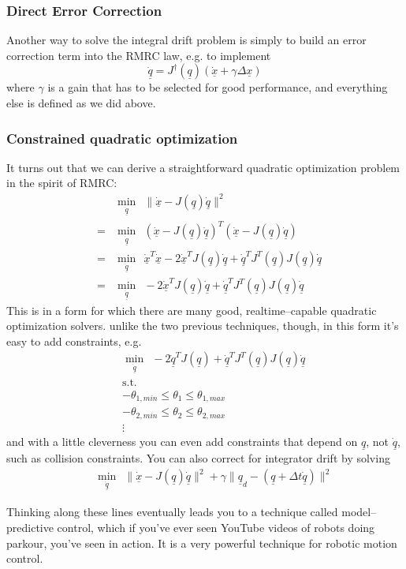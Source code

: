 \documentclass[]{article}
\begin{document}
\subsubsection{Direct Error Correction}
Another way to solve the integral drift problem is simply to build an error correction term into the RMRC law, e.g. to implement
\begin{displaymath}
\dot{\underline{q}} = J^{\dag}(\underline{q})\left(\dot{\underline{x}} + \gamma \Delta \underline{x}\right)
\end{displaymath}
where $\gamma$ is a gain that has to be selected for good performance, and everything else is defined as we did above.
\subsubsection{Constrained quadratic optimization}
It turns out that we can derive a straightforward quadratic optimization problem in the spirit of RMRC:
\begin{eqnarray}
&&\min_{\dot{\underline{q}}} \ \ \|\dot{\underline{x}} - J(\underline{q})\dot{\underline{q}}\|^{2} \nonumber \\
& = & \min_{\dot{\underline{q}}}\ \ \left( \dot{\underline{x}} - J(\underline{q})\dot{\underline{q}} \right)^{T}\left( \dot{\underline{x}} - J(\underline{q})\dot{\underline{q}} \right) \nonumber \\
& = & \min_{\dot{\underline{q}}}\ \ \dot{\underline{x}}^{T}\dot{\underline{x}} - 2\dot{\underline{x}}^{T}J(\underline{q})\dot{\underline{q}} + \dot{\underline{q}}^{T}J^{T}(\underline{q})J(\underline{q})\dot{\underline{q}} \nonumber \\
& = & \min_{\dot{\underline{q}}}\ \ -2\dot{\underline{x}}^{T}J(\underline{q})\dot{\underline{q}} + \dot{\underline{q}}^{T}J^{T}(\underline{q})J(\underline{q})\dot{\underline{q}} \nonumber
\end{eqnarray}
This is in a form for which there are many good, realtime--capable quadratic optimization solvers. unlike the two previous techniques, though, in this form it's easy to add constraints, e.g.
\begin{eqnarray}
&& \min_{\dot{\underline{q}}}\ \ -2\dot{\underline{q}}^{T}J(\underline{q}) + \dot{\underline{q}}^{T}J^{T}(\underline{q})J(\underline{q})\dot{\underline{q}} \nonumber \\
&&\text{s.t.} \nonumber \\
&&-\theta_{1,min} \le \theta_{1} \le \theta_{1,max} \nonumber \\
&&-\theta_{2,min} \le \theta_{2} \le \theta_{2,max} \nonumber \\
&&\vdots \nonumber
\end{eqnarray}
and with a little cleverness you can even add constraints that depend on $\underline{q}$, not $\dot{\underline{q}}$, such as collision constraints. You can also correct for integrator drift by solving
\begin{eqnarray}
&& \min_{\dot{\underline{q}}} \ \ \|\dot{\underline{x}} - J(\underline{q})\dot{\underline{q}}\|^{2} + \gamma \| \underline{q}_{d} - \left(\underline{q} + \Delta t \dot{\underline{q}} \right) \| ^{2} \nonumber 
\end{eqnarray}

Thinking along these lines eventually leads you to a technique called model--predictive control, which if you've ever seen YouTube videos of robots doing parkour, you've seen in action. It is a very powerful technique for robotic motion control.
\end{document}
